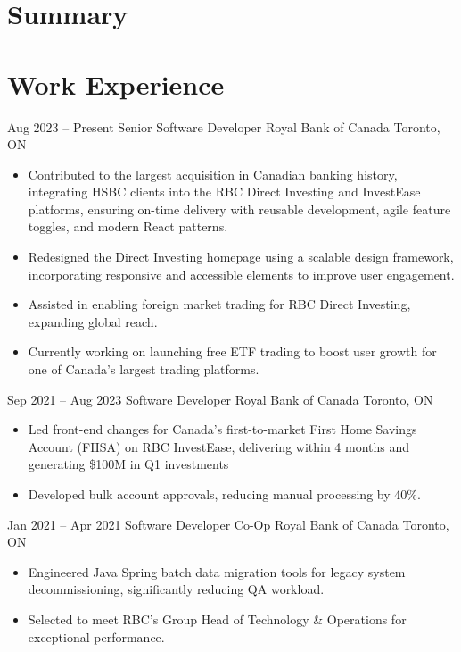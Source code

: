 \documentclass[letterpaper]{moderncv}
\begin{document}
\makecvtitle

\section{Summary}

\section{Work Experience}
\cventry
{Aug 2023 -- Present}
{Senior Software Developer}
{Royal Bank of Canada}
{Toronto, ON}
{}
{\begin{itemize}%
	\item Contributed to the largest acquisition in Canadian banking history, integrating HSBC clients into the RBC Direct Investing and InvestEase platforms, ensuring on-time delivery with reusable development, agile feature toggles, and modern React patterns.
	\item Redesigned the Direct Investing homepage using a scalable design framework, incorporating responsive and accessible elements to improve user engagement.
	\item Assisted in enabling foreign market trading for RBC Direct Investing, expanding global reach.
	\item Currently working on launching free ETF trading to boost user growth for one of Canada’s largest trading platforms.
	\end{itemize}}
\cventry
{Sep 2021 -- Aug 2023}
{Software Developer}
{Royal Bank of Canada}
{Toronto, ON}
{}
{\begin{itemize}%
	\item Led front-end changes for Canada's first-to-market First Home Savings Account (FHSA) on RBC InvestEase, delivering within 4 months and generating \$100M in Q1 investments
	\item Developed bulk account approvals, reducing manual processing by 40\%.
	\end{itemize}}
\cventry
{Jan 2021 -- Apr 2021}
{Software Developer Co-Op}
{Royal Bank of Canada}
{Toronto, ON}
{}
{\begin{itemize}%
	\item Engineered Java Spring batch data migration tools for legacy system decommissioning, significantly reducing QA workload.
	\item Selected to meet RBC's Group Head of Technology \& Operations for exceptional performance.
	\end{itemize}}
\end{document}
